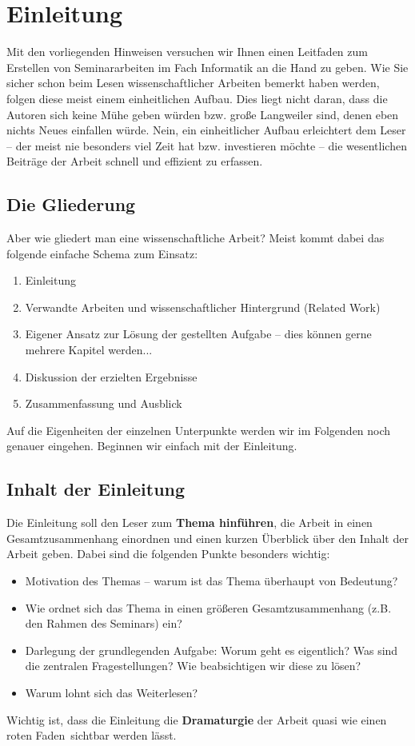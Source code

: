 \section{Einleitung}
\label{sec_einleitung}

\noindent
Mit den vorliegenden Hinweisen versuchen wir Ihnen einen Leitfaden zum Erstellen von Seminararbeiten im Fach Informatik an die Hand zu geben.
Wie Sie sicher schon beim Lesen wissenschaftlicher Arbeiten bemerkt haben werden, folgen diese meist einem einheitlichen Aufbau.
Dies liegt nicht daran, dass die Autoren sich keine Mühe geben würden bzw. große Langweiler sind, denen eben nichts Neues einfallen würde.
Nein, ein einheitlicher Aufbau erleichtert dem Leser -- der meist nie besonders viel Zeit hat bzw. investieren möchte -- die wesentlichen Beiträge der Arbeit schnell und effizient zu erfassen.


\subsection{Die Gliederung}
Aber wie gliedert man eine wissenschaftliche Arbeit?
Meist kommt dabei das folgende einfache Schema zum Einsatz:
\begin{enumerate}
\item Einleitung
\item Verwandte Arbeiten und wissenschaftlicher Hintergrund (Related Work)
\item Eigener Ansatz zur Lösung der gestellten Aufgabe -- dies können gerne mehrere Kapitel werden...
\item Diskussion der erzielten Ergebnisse
\item Zusammenfassung und Ausblick 
\end{enumerate}

Auf die Eigenheiten der einzelnen Unterpunkte werden wir im Folgenden noch genauer eingehen.
Beginnen wir einfach mit der Einleitung.

\subsection{Inhalt der Einleitung}
Die Einleitung soll den Leser zum {\bf Thema hinführen}, die Arbeit in einen Gesamtzusammenhang einordnen und einen kurzen Überblick über den Inhalt der Arbeit geben. 
Dabei sind die folgenden Punkte besonders wichtig:

\begin{itemize}
\item Motivation des Themas -- warum ist das Thema überhaupt von Bedeutung?
\item Wie ordnet sich das Thema in einen größeren Gesamtzusammenhang (z.B. den Rahmen des Seminars) ein?
\item Darlegung der grundlegenden Aufgabe: Worum geht es eigentlich? Was sind die zentralen Fragestellungen? Wie beabsichtigen wir diese zu lösen?
\item Warum lohnt sich das Weiterlesen? 
\end{itemize}
Wichtig ist, dass die Einleitung die {\bf Dramaturgie} der Arbeit quasi wie einen \glqq roten Faden\grqq\, sichtbar werden lässt.

